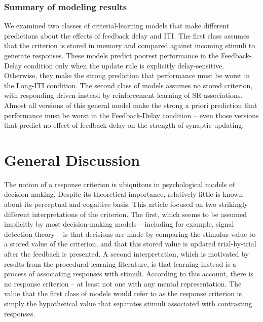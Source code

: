 \documentclass[doc, floatsintext]{apa7}
\begin{document}
\subsubsection{Summary of modeling results}
We examined two classes of criterial-learning models that
make different predictions about the effects of feedback
delay and ITI. The first class assumes that the criterion is
stored in memory and compared against incoming stimuli to
generate responses. These models predict poorest performance
in the Feedback-Delay condition only when the update rule is
explicitly delay-sensitive. Otherwise, they make the strong
prediction that performance must be worst in the Long-ITI
condition. The second class of models assumes no stored
criterion, with responding driven instead by reinforcement
learning of SR associations. Almost all versions of this
general model make the strong a priori prediction that
performance must be worst in the Feedback-Delay condition --
even those versions that predict no effect of feedback delay
on the strength of synaptic updating. 

\section{General Discussion}
The notion of a response criterion is ubiquitous in
psychological models of decision making. Despite its
theoretical importance, relatively little is known about its
perceptual and cognitive basis. This article focused on two
strikingly different interpretations of the criterion. The
first, which seems to be assumed implicitly by most
decision-making models -- including for example, signal
detection theory -- is that decisions are made by comparing
the stimulus value to a stored value of the criterion, and
that this stored value is updated trial-by-trial after the
feedback is presented. A second interpretation, which is
motivated by results from the procedural-learning
literature, is that learning instead is a process of
associating responses with stimuli. According to this
account, there is no response criterion -- at least not one
with any mental representation. The value that the first
class of models would refer to as the response criterion is
simply the hypothetical value that separates stimuli
associated with contrasting responses. 
\end{document}
